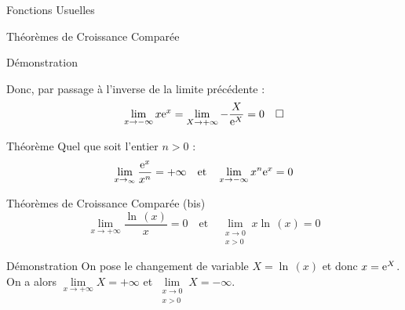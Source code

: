 \documentclass{cours}
\begin{document}
\begin{Gpartie}{Fonctions Usuelles}
\begin{Spartie}{Théorèmes de Croissance Comparée}
\begin{SSpartie}{Démonstration}
\begin{itemize}
                    Donc, par passage à l'inverse de la limite précédente : 
                    \[\lim\limits_{x\to-\infty}x\mathrm{e}^x=\lim\limits_{X\to+\infty}-\frac{X}{\mathrm{e}^X}=0\quad\square\]
                \end{itemize}
            \end{SSpartie}
        \end{Spartie}
        \begin{Spartie}{Théorème} 
            Quel que soit l'entier $n>0$ : \[\lim\limits_{x\to_\infty}\frac{\mathrm{e}^x}{x^n}=+\infty\quad\text{et}\quad\lim\limits_{x\to-\infty}x^n\mathrm{e}^x=0\]
        \end{Spartie}
        \begin{Spartie}{Théorèmes de Croissance Comparée (bis)} 
            \[\lim\limits_{x\to+\infty}\frac{\ln\,(x)}{x}=0\quad\text{et}\quad\lim\limits_{\substack{x\to0 \\ x>0}}x\ln\,(x)=0\]
            \begin{SSpartie}{Démonstration} 
                On pose le changement de variable $X=\ln\,(x)$ et donc $x=\mathrm{e}^X$. On a alors $\lim\limits_{x\to+\infty}X=+\infty$ et $\lim\limits_{\substack{x\to0 \\ x>0}}X=-\infty$.
            \end{SSpartie}
        \end{Spartie}
    \end{Gpartie}
\end{document}

